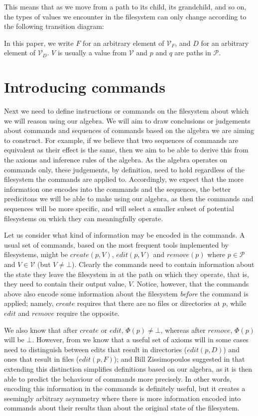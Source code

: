 \documentclass[12pt]{article}
\newcommand{\setv}{\mathcal{V}}
\newcommand{\setvx}[1]{\mathcal{V}_{#1}}
\newcommand{\setf}{\setvx{F}}
\newcommand{\setd}{\setvx{D}}
\newcommand{\setp}{\mathcal{P}}
\newcommand{\empt}{\bot}
\newcommand{\FS}{\Phi} %
\theoremstyle{definition}
\begin{document}
This means that as we move from a path to its child, its grandchild, and so on,
the types of values we encounter in the filesystem can only change according to the following
transition diagram:



In this paper, we write $F$ for an arbitrary element of $\setf$, and $D$ for an arbitrary element
of $\setd$. $V$ is usually a value from $\setv$ and $p$ and $q$ are paths in $\setp$.

\section{Introducing commands}

Next we need to define instructions or commands on the filesystem about which we will reason
using our algebra.
We will aim to draw conclusions or judgements about commands and sequences of commands
based on the algebra we are aiming to construct.
For example, if we believe that two sequences of commands are equivalent as their effect
is the same, then we aim to be able to derive this from the axioms and inference rules of the
algebra.
As the algebra operates on commands only,
these judgements, by definition, need to hold regardless of the filesystem the commands are applied to.
Accordingly, we expect that the more information one encodes into the commands and the sequences,
the better predicitons we will be able to make using our algebra,
as then the commands and sequences will be more specific, and will select a smaller subset
of potential filesystems on which they can meaningfully operate.

Let us consider what kind of information may be encoded in the commands.
A usual set of commands, based on the most frequent tools implemented by filesystems,
might be $create(p,V)$, $edit(p,V)$ and $remove(p)$ where $p\in\setp$ and $V\in\setv$ (but $V\neq\empt$).
Clearly the commands need to contain information about the state they leave the filesystem
in at the path on which they operate, that is, they need to contain their output value, $V$.
Notice, however, that the commands above also encode some information about the filesystem
\emph{before} the command is applied; namely, $create$ requires that there are no files
or directories at $p$, while $edit$ and $remove$ require the opposite.

We also know that after $create$ or $edit$, $\FS(p)\neq\empt$, whereas after $remove$,
$\FS(p)$ will be $\empt$. However, from \cite{NREC:alg} we know that a useful set of axioms
will in some cases need to distinguish between edits that result in directories ($edit(p,D)$) and
ones that result in files ($edit(p,F)$);
and Bill Zissimopoulos suggested in \cite{BZ} that extending this distinction simplifies
definitions based on our algebra, as it is then able to predict the behaviour of commands
more precisely. 
In other words, encoding this information in the commands is definitely useful,
but it creates a seemingly arbitrary asymmetry where
there is more information encoded into commands about their results than about the
original state of the filesystem.
\end{document}
